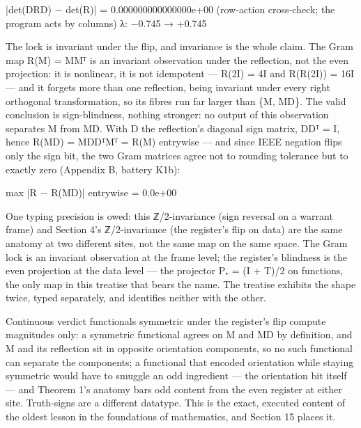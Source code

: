 \documentclass[10pt]{article}
\renewcommand{\_}{\origunderscore\allowbreak}
\newenvironment{Shaded}{}{}
\newcommand{\DecValTok}[1]{#1}
\newcommand{\FloatTok}[1]{#1}
\newcommand{\FunctionTok}[1]{#1}
\newcommand{\NormalTok}[1]{#1}
\newcommand{\OperatorTok}[1]{#1}
\begin{document}
\begin{Shaded}
\begin{Highlighting}[]
\OperatorTok{|}\FunctionTok{det}\NormalTok{(DRD) − }\FunctionTok{det}\NormalTok{(R)}\OperatorTok{|} \OperatorTok{=} \FloatTok{0.000000000000000e+00}\NormalTok{   (row}\OperatorTok{{-}}\NormalTok{action cross}\OperatorTok{{-}}\NormalTok{check}\OperatorTok{;}\NormalTok{ the program acts by columns)   λ}\OperatorTok{:}\NormalTok{ −0}\OperatorTok{.}\DecValTok{745}\NormalTok{ → }\OperatorTok{+}\FloatTok{0.745}
\end{Highlighting}
\end{Shaded}

The lock is invariant under the flip, and invariance is the whole claim.
The Gram map R(M) = MMᵀ is an invariant observation under the
reflection, not the even projection: it is nonlinear, it is not
idempotent --- R(2I) = 4I and R(R(2I)) = 16I --- and it forgets more
than one reflection, being invariant under every right orthogonal
transformation, so its fibres run far larger than \{M, MD\}. The valid
conclusion is sign-blindness, nothing stronger: no output of this
observation separates M from MD. With D the reflection's diagonal sign
matrix, DDᵀ = I, hence R(MD) = MDDᵀMᵀ = R(M) entrywise --- and since
IEEE negation flips only the sign bit, the two Gram matrices agree not
to rounding tolerance but to exactly zero (Appendix B, battery K1b):

\begin{Shaded}
\begin{Highlighting}[]
\NormalTok{max }\OperatorTok{|}\NormalTok{R − }\FunctionTok{R}\NormalTok{(MD)}\OperatorTok{|}\NormalTok{ entrywise }\OperatorTok{=} \FloatTok{0.0e+00}
\end{Highlighting}
\end{Shaded}

One typing precision is owed: this ℤ/2-invariance (sign reversal on a
warrant frame) and Section 4's ℤ/2-invariance (the register's flip on
data) are the same anatomy at two different sites, not the same map on
the same space. The Gram lock is an invariant observation at the frame
level; the register's blindness is the even projection at the data level
--- the projector P₊ = (I + T)/2 on functions, the only map in this
treatise that bears the name. The treatise exhibits the shape twice,
typed separately, and identifies neither with the other.

Continuous verdict functionals symmetric under the register's flip
compute magnitudes only: a symmetric functional agrees on M and MD by
definition, and M and its reflection sit in opposite orientation
components, so no such functional can separate the components; a
functional that encoded orientation while staying symmetric would have
to smuggle an odd ingredient --- the orientation bit itself --- and
Theorem 1's anatomy bars odd content from the even register at either
site. Truth-signs are a different datatype. This is the exact, executed
content of the oldest lesson in the foundations of mathematics, and
Section 15 places it.
\end{document}
